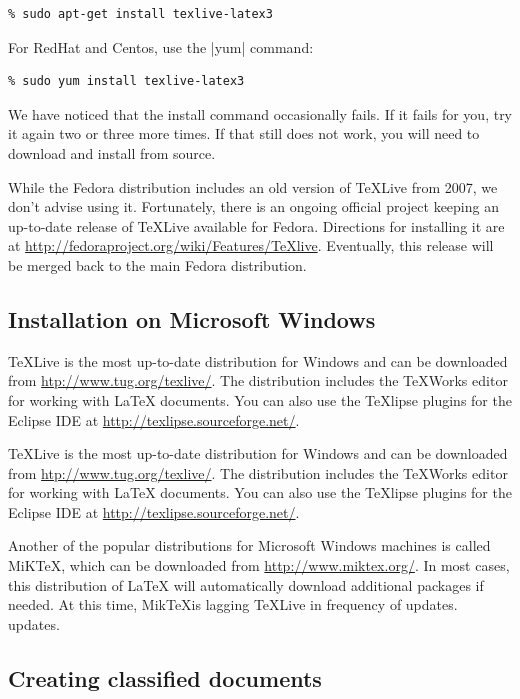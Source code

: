 \begin{Verbatim}
% sudo apt-get install texlive-latex3
\end{Verbatim}

For RedHat and Centos, use the |yum| command:

\begin{Verbatim}
% sudo yum install texlive-latex3
\end{Verbatim}

We have noticed that the install command occasionally fails. If it fails for
you, try it again two or three more times. If that still does not work, you
will need to download and install from source.

While the Fedora distribution includes an old version of \TeX Live from 2007,
we don't advise using it.  Fortunately, there is an ongoing official project
keeping an up-to-date release of \TeX Live available for Fedora.  Directions
for installing it are at \url{http://fedoraproject.org/wiki/Features/TeXlive}.
Eventually, this release will be merged back to the main Fedora distribution.

\subsection{Installation on Microsoft Windows}

\TeX Live is the most up-to-date distribution for Windows and can be downloaded
from \url{htp://www.tug.org/texlive/}.  The distribution includes the
{\TeX}Works editor for working with \LaTeX{} documents.  You can also use the
{\TeX}lipse plugins for the Eclipse IDE at
\url{http://texlipse.sourceforge.net/}.

\TeX Live is the most up-to-date distribution for Windows and can be downloaded
from \url{htp://www.tug.org/texlive/}.  The distribution includes the
{\TeX}Works editor for working with \LaTeX{} documents.  You can also use the
{\TeX}lipse plugins for the Eclipse IDE at
\url{http://texlipse.sourceforge.net/}.

Another of the popular distributions for Microsoft Windows machines is called
MiK\TeX, which can be downloaded from \url{http://www.miktex.org/}.  In most
cases, this distribution of \LaTeX{} will automatically download additional
packages if needed.  At this time, Mik\TeX is lagging \TeX Live in frequency of
updates.  updates.

\subsection{Creating classified documents}


